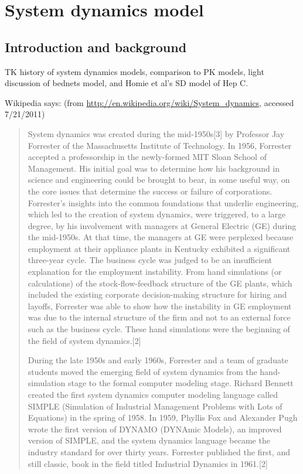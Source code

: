 \chapter{System dynamics model}
\label{chapter:system-dynamics}
\section{Introduction and background}

TK history of system dynamics models, comparison to PK models, light
discussion of bednets model, and Homie et al's SD model of Hep C.

Wikipedia says: (from \url{http://en.wikipedia.org/wiki/System_dynamics}, accessed 7/21/2011)
\begin{quote}
System dynamics was created during the mid-1950s[3] by Professor Jay
Forrester of the Massachusetts Institute of Technology. In 1956,
Forrester accepted a professorship in the newly-formed MIT Sloan
School of Management. His initial goal was to determine how his
background in science and engineering could be brought to bear, in
some useful way, on the core issues that determine the success or
failure of corporations. Forrester's insights into the common
foundations that underlie engineering, which led to the creation of
system dynamics, were triggered, to a large degree, by his involvement
with managers at General Electric (GE) during the mid-1950s. At that
time, the managers at GE were perplexed because employment at their
appliance plants in Kentucky exhibited a significant three-year
cycle. The business cycle was judged to be an insufficient explanation
for the employment instability. From hand simulations (or
calculations) of the stock-flow-feedback structure of the GE plants,
which included the existing corporate decision-making structure for
hiring and layoffs, Forrester was able to show how the instability in
GE employment was due to the internal structure of the firm and not to
an external force such as the business cycle. These hand simulations
were the beginning of the field of system dynamics.[2]

During the late 1950s and early 1960s, Forrester and a team of
graduate students moved the emerging field of system dynamics from the
hand-simulation stage to the formal computer modeling stage. Richard
Bennett created the first system dynamics computer modeling language
called SIMPLE (Simulation of Industrial Management Problems with Lots
of Equations) in the spring of 1958. In 1959, Phyllis Fox and
Alexander Pugh wrote the first version of DYNAMO (DYNAmic Models), an
improved version of SIMPLE, and the system dynamics language became
the industry standard for over thirty years. Forrester published the
first, and still classic, book in the field titled Industrial Dynamics
in 1961.[2]


\end{quote}
